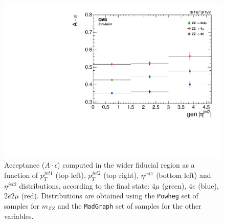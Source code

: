 \begin{figure}[hbtp]
\begin{center}
    \includegraphics[width=\cmsFigWidth]{Figures/DiffAcceptance_EtaJet2_Mad}
    \caption{Acceptance ($A \cdot \epsilon$) computed in the wider fiducial region as a function of $p_T^{jet1}$  (top left), $p_T^{jet2}$  (top right), $\eta^{jet1}$ (bottom left) and $\eta^{jet2}$
distributions, according to the final state: 
      $4\mu$ (green), $4e$ (blue), $2e2\mu$  (red). Distributions are obtained using the  \texttt{Powheg} set of samples for  $m_{ZZ}$ and 
     the  \texttt{MadGraph} set of samples for the other variables.} 
    \label{fig:A_diff_jet}
  \end{center}
\end{figure}

